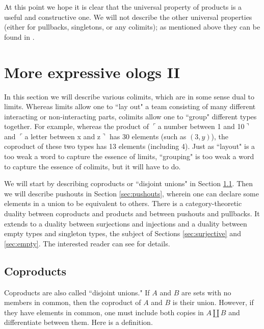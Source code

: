 \documentclass{amsart}
\newcommand{\fakebox}[1]{\tn{$\ulcorner$#1$\urcorner$}}
\theoremstyle{remark}
\theoremstyle{definition}
\def\tn{\textnormal}
\begin{document}
At this point we hope it is clear that the universal property of products is a useful and constructive one. We will not describe the other universal properties (either for pullbacks, singletons, or any colimits); as mentioned above they can be found in \cite{Awo}.




\section{More expressive ologs II}\label{sec:expressive II}

In this section we will describe various colimits, which are in some sense dual to limits. Whereas limits allow one to ``lay out" a team consisting of many different interacting or non-interacting parts, colimits allow one to ``group" different types together. For example, whereas the product of \fakebox{a number between 1 and 10} and \fakebox{a letter between x and z} has 30 elements (such as $(3,y)$), the coproduct of these two types has 13 elements (including 4). Just as ``layout" is a too weak a word to capture the essence of limits, ``grouping" is too weak a word to capture the essence of colimits, but it will have to do.

We will start by describing coproducts or ``disjoint unions" in Section \ref{sec:coproducts}. Then we will describe pushouts in Section \ref{sec:pushouts}, wherein one can declare some elements in a union to be equivalent to others. There is a category-theoretic duality between coproducts and products and between pushouts and pullbacks. It extends to a duality between surjections and injections and a duality between empty types and singleton types, the subject of Sections \ref{sec:surjective} and \ref{sec:empty}. The interested reader can see \cite{Awo} for details.

\subsection{Coproducts}\label{sec:coproducts}

Coproducts are also called ``disjoint unions."  If $A$ and $B$ are sets with no members in common, then the coproduct of $A$ and $B$ is their union. However, if they have elements in common, one must include both copies in $A\amalg B$ and differentiate between them. Here is a definition.
\end{document}

